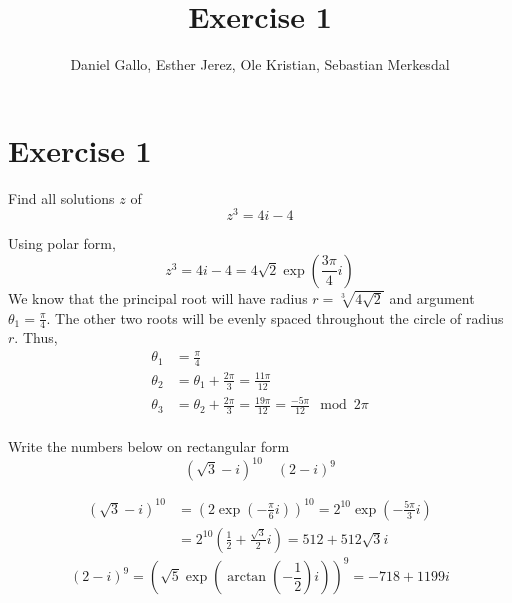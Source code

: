 \documentclass{report}
\title{Exercise 1}
\author{Daniel Gallo, Esther Jerez, Ole Kristian, Sebastian Merkesdal}
\renewcommand{\exp}[1]{\operatorname{exp}\left(#1\right)}
\renewcommand{\arctan}[1]{\operatorname{arctan} \left(#1\right)}
\begin{document}
    \maketitle
    
    \section*{Exercise 1}
    \begin{tcolorbox}[title=Part a]
        Find all solutions $z$ of
        \begin{equation*}
            z^3 = 4i - 4
        \end{equation*}
    \end{tcolorbox}
    \noindent
    Using polar form,
    \begin{equation*}
        z^3 = 4i - 4 = 4\sqrt{2}\exp{\frac{3\pi}{4}i}
    \end{equation*}
    We know that the principal root will have radius $r = \sqrt[3]{4\sqrt{2}}$ and argument $\theta_1 = \frac{\pi}{4}$. The other two roots will be evenly spaced throughout the circle of radius $r$. Thus,
    \begin{align*}
        \theta_1 &= \frac{\pi}{4} \\
        \theta_2 &= \theta_1 + \frac{2\pi}{3} = \frac{11\pi}{12} \\
        \theta_3 &= \theta_2 + \frac{2\pi}{3} = \frac{19\pi}{12} = \frac{-5\pi}{12} \mod{2\pi}\\
    \end{align*}
    \begin{tcolorbox}[title=Part b]
        Write the numbers below on rectangular form
        \begin{equation*}
            (\sqrt{3} - i)^{10} \quad (2 - i)^{9}
        \end{equation*}
    \end{tcolorbox}
    \begin{align*}
        (\sqrt{3} - i)^{10} &= \left(2\exp{-\frac{\pi}{6}i}\right)^{10} = 2^{10}\exp{-\frac{5\pi}{3}i} \\
        &= 2^{10}\left(\frac{1}{2} + \frac{\sqrt{3}}{2}i\right) = 512 + 512\sqrt{3}i
    \end{align*}
    \begin{equation*}
        (2 - i)^{9} = \left(\sqrt{5}\exp{\arctan{-\frac{1}{2}}i}\right)^{9} = -718 + 1199i
    \end{equation*}
\end{document}
